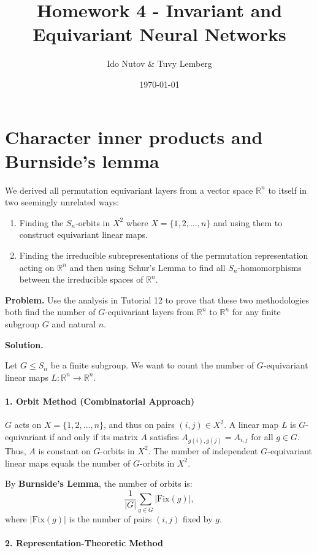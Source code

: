 \documentclass[11pt]{article}
\title{Homework 4 - Invariant and Equivariant Neural
Networks}
\author{Ido Nutov \& Tuvy Lemberg}
\date{\today}
\begin{document}
\maketitle

\section{Character inner products and Burnside's lemma}
\label{sec:q1}

We derived all permutation equivariant layers from a vector space $\mathbb{R}^n$ to itself in two seemingly unrelated ways:

\begin{enumerate}
    \item Finding the $S_n$-orbits in $X^2$ where $X = \{1, 2, \ldots, n\}$ and using them to construct equivariant linear maps.
    \item Finding the irreducible subrepresentations of the permutation representation acting on $\mathbb{R}^n$ and then using Schur's Lemma to find all $S_n$-homomorphisms between the irreducible spaces of $\mathbb{R}^n$.
\end{enumerate}

\textbf{Problem.} Use the analysis in Tutorial 12 to prove that these two methodologies both find the number of $G$-equivariant layers from $\mathbb{R}^n$ to $\mathbb{R}^n$ for any finite subgroup $G$ and natural $n$.

\textbf{Solution.}

Let $G \leq S_n$ be a finite subgroup. We want to count the number of $G$-equivariant linear maps $L: \mathbb{R}^n \to \mathbb{R}^n$.

\paragraph{1. Orbit Method (Combinatorial Approach)}

$G$ acts on $X = \{1,2,\ldots,n\}$, and thus on pairs $(i,j) \in X^2$. A linear map $L$ is $G$-equivariant if and only if its matrix $A$ satisfies $A_{g(i),g(j)} = A_{i,j}$ for all $g \in G$. Thus, $A$ is constant on $G$-orbits in $X^2$. The number of independent $G$-equivariant linear maps equals the number of $G$-orbits in $X^2$.

By \textbf{Burnside's Lemma}, the number of orbits is:
\[
\frac{1}{|G|} \sum_{g \in G} |\mathrm{Fix}(g)|,
\]
where $|\mathrm{Fix}(g)|$ is the number of pairs $(i,j)$ fixed by $g$.

\paragraph{2. Representation-Theoretic Method}
\end{document}
